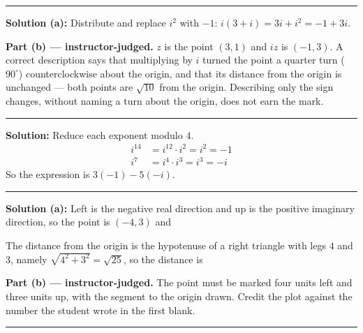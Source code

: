 \documentclass[12pt]{article}
\begin{document}
\vspace{0.15cm}
\noindent\rule{\linewidth}{0.2pt}


\textbf{Solution (a):} Distribute and replace $i^{2}$ with $-1$:
$i(3 + i) = 3i + i^{2} = -1 + 3i$. 

\textbf{Part (b) --- instructor-judged.} $z$ is the point $(3, 1)$ and $iz$ is
$(-1, 3)$. A correct description says that multiplying by $i$ turned the point a
quarter turn ($90^\circ$) counterclockwise about the origin, and that its
distance from the origin is unchanged --- both points are $\sqrt{10}$ from the
origin. Describing only the sign changes, without naming a turn about the
origin, does not earn the mark.

\vspace{0.15cm}
\noindent\rule{\linewidth}{0.2pt}


\textbf{Solution:} Reduce each exponent modulo $4$.
\begin{align*}
  i^{14} &= i^{12} \cdot i^{2} = i^{2} = -1 \\
  i^{7}  &= i^{4} \cdot i^{3} = i^{3} = -i
\end{align*}
So the expression is $3(-1) - 5(-i)$. 

\vspace{0.15cm}
\noindent\rule{\linewidth}{0.2pt}


\textbf{Solution (a):} Left is the negative real direction and up is the
positive imaginary direction, so the point is $(-4, 3)$ and 

The distance from the origin is the hypotenuse of a right triangle with legs
$4$ and $3$, namely $\sqrt{4^{2} + 3^{2}} = \sqrt{25}$, so the distance is 

\textbf{Part (b) --- instructor-judged.} The point must be marked four units
left and three units up, with the segment to the origin drawn. Credit the plot
against the number the student wrote in the first blank.

\vspace{0.15cm}
\noindent\rule{\linewidth}{0.2pt}

\end{document}
